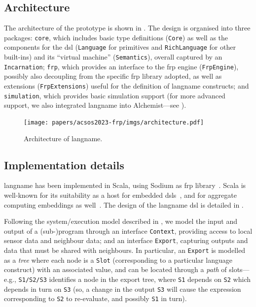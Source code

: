 \subsection{Architecture}
\label{acsos2023-frp:sec:impl:arch}

The architecture of the prototype is shown in .
%
The design is organised into three packages:
    \texttt{core},
        which includes basic type definitions
        (\texttt{Core}) as well as the components for the \ac{dsl}
        (\texttt{Language} for primitives and \texttt{RichLanguage} for other built-ins)
        and its ``virtual machine'' (\texttt{Semantics}),
        overall captured by an \texttt{Incarnation};
    \texttt{frp},
        which provides an interface to the \ac{frp} engine (\texttt{FrpEngine}),
        possibly also decoupling from the specific \ac{frp} library adopted,
        as well as extensions (\texttt{FrpExtensions}) useful for the definition of \ac{langname} constructs;
    and \texttt{simulation},
        which provides basic simulation support
        (for more advanced support, we also integrated \ac{langname} into Alchemist---see ).

\begin{figure}
\texttt{[image: papers/acsos2023-frp/imgs/architecture.pdf]}
\caption{Architecture of \ac{langname}.}
\label{acsos2023-frp:fig:arch}
\end{figure}


\subsection{Implementation details}
\label{acsos2023-frp:sec:impl:impl}

\ac{langname} has been implemented in Scala,
 using Sodium as \ac{frp} library~\cite{blackheath2016frp-sodium}.
%
Scala is well-known for its suitability
 as a host for embedded \acp{dsl}~\cite{DBLP:conf/icfem/ArthoHKY15},
and for aggregate computing embeddings as well~\cite{DBLP:journals/lmcs/AudritoCDV23}. %
%
The design of the \ac{langname} \ac{dsl}
 is detailed in .

Following the system/execution model described in ,
  we model the input and output 
  of a (sub-)program 
  through an interface \texttt{Context},
  providing access to local sensor data and neighbour data;
  and an interface \texttt{Export},
  capturing outputs and data that must be shared with neighbours.
%
In particular, an \texttt{Export} 
 is modelled as a \emph{tree}
 where each node is a \texttt{Slot}
(corresponding to a particular language construct)
with an associated value,
 and can be located through a \emph{path} of slots---e.g.,
\texttt{S1/S2/S3} identifies a node in the export tree,
where \texttt{S1} depends on \texttt{S2} which depends in turn on \texttt{S3}
(so, a change in the output \texttt{S3} will cause the expression corresponding to \texttt{S2} to re-evaluate, and possibly \texttt{S1} in turn).

